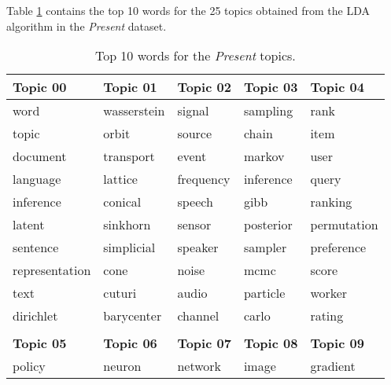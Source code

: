 Table \ref{tab:pres-topics} contains the top 10 words for the 25 topics obtained from the LDA algorithm in the \textit{Present} dataset.

\begin{center}
\begin{longtable}{
		>{\centering\arraybackslash}p{}
		>{\centering\arraybackslash}p{}
		>{\centering\arraybackslash}p{}
		>{\centering\arraybackslash}p{}
		>{\centering\arraybackslash}p{}}
	\caption{Top 10 words for the \textit{Present} topics.} \label{tab:pres-topics} \\		
	\hline
	\textbf{Topic 00} & \textbf{Topic 01} & \textbf{Topic 02} & \textbf{Topic 03} & \textbf{Topic 04} \\ \hline
	word              & wasserstein       & signal            & sampling          & rank              \\
	topic             & orbit             & source            & chain             & item              \\
	document          & transport         & event             & markov            & user              \\
	language          & lattice           & frequency         & inference         & query             \\
	inference         & conical           & speech            & gibb              & ranking           \\
	latent            & sinkhorn          & sensor            & posterior         & permutation       \\
	sentence          & simplicial        & speaker           & sampler           & preference        \\
	representation    & cone              & noise             & mcmc              & score             \\
	text              & cuturi            & audio             & particle          & worker            \\
	dirichlet         & barycenter        & channel           & carlo             & rating            \\ \hline
	                  &                   &                   &                   &                   \\ \hline
	\textbf{Topic 05} & \textbf{Topic 06} & \textbf{Topic 07} & \textbf{Topic 08} & \textbf{Topic 09} \\ \hline
	policy            & neuron            & network           & image             & gradient          \\

\end{longtable}
\end{center}
